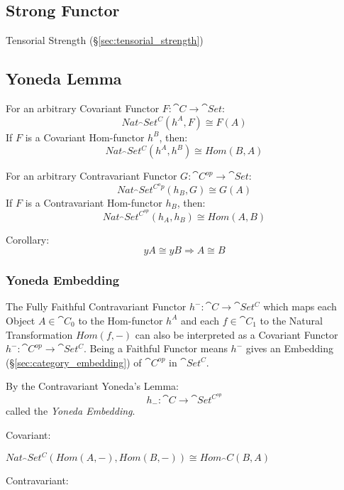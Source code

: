 \subsection{Strong Functor}\label{sec:strong_functor}

Tensorial Strength (\S\ref{sec:tensorial_strength})



\subsection{Yoneda Lemma}\label{sec:yoneda_lemma}

For an arbitrary Covariant Functor $F : \cat{C} \rightarrow
\cat{Set}$:
\[
  Nat_\cat{Set^C}(h^A,F) \cong F(A)
\]
If $F$ is a Covariant Hom-functor $h^B$, then:
\[
  Nat_\cat{Set^C}(h^A,h^B) \cong Hom(B,A)
\]

For an arbitrary Contravariant Functor $G : \cat{C}^{op} \rightarrow
\cat{Set}$:
\[
  Nat_\cat{Set^{C^op}}(h_B,G) \cong G(A)
\]
If $F$ is a Contravariant Hom-functor $h_B$, then:
\[
  Nat_\cat{Set^{C^{op}}}(h_A,h_B) \cong Hom(A,B)
\]

Corollary:
\[
  yA \cong yB \Rightarrow A \cong B
\]



\subsubsection{Yoneda Embedding}\label{sec:yoneda_embedding}

The Fully Faithful Contravariant Functor $h^- : \cat{C} \rightarrow
\cat{Set^C}$ which maps each Object $A \in \cat{C}_0$ to the
Hom-functor $h^A$ and each $f \in \cat{C}_1$ to the Natural
Transformation $Hom(f,-)$ can also be interpreted as a Covariant
Functor $h^- : \cat{C^{op}} \rightarrow \cat{Set^C}$. Being a
Faithful Functor means $h^-$ gives an Embedding
(\S\ref{sec:category_embedding}) of $\cat{C^{op}}$ in
$\cat{Set^C}$.

By the Contravariant Yoneda's Lemma:
\[
  h_-: \cat{C} \rightarrow \cat{Set^{C^{op}}}
\]
called the \emph{Yoneda Embedding}.

Covariant:

$Nat_\cat{Set^C}(Hom(A,-), Hom(B,-)) \cong Hom_\cat{C}(B,A)$

Contravariant:

